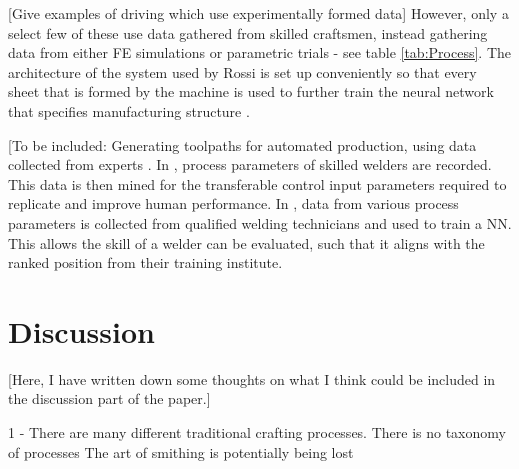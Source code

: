 [Give examples of driving which use experimentally formed data]
However, only a select few of these use data gathered from skilled craftsmen, instead gathering data from either FE simulations or parametric trials  - see table \ref{tab:Process}.
The architecture of the system used by Rossi is set up conveniently so that every sheet that is formed by the machine is used to further train the neural network that specifies manufacturing structure \citep{Rossi2018a}.

[To be included: Generating toolpaths for automated production, using data collected from experts \citep{Ng2017}. In \citep{French2019}, process parameters of skilled welders are recorded. This data is then mined for the transferable control input parameters required to replicate and improve human performance. In \citep{Kumar2018}, data from various process parameters is collected from   qualified welding technicians and used to train a NN. This allows the skill of a welder can be evaluated, such that it aligns with the ranked position from their training institute.










\section{Discussion}

[Here, I have written down some thoughts on what I think could be included in the discussion part of the paper.]

 
 1 - There are many different traditional crafting processes.
There is no taxonomy of processes
The art of smithing is potentially being lost

